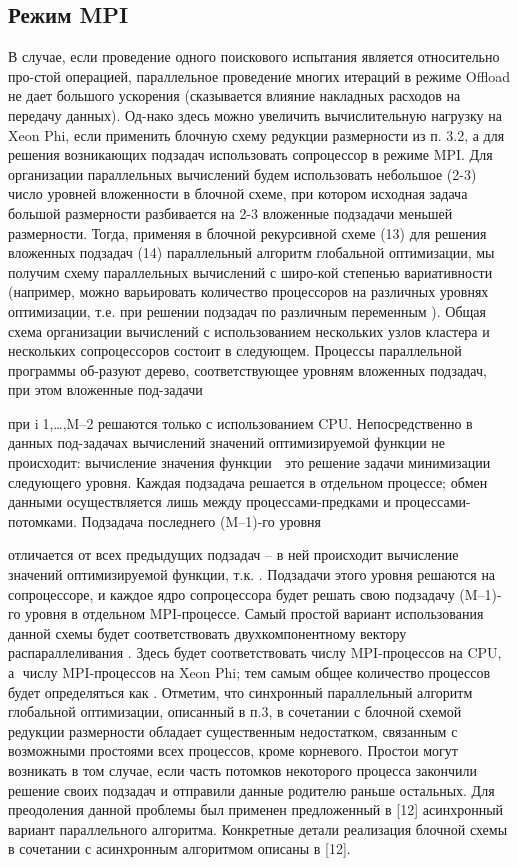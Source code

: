 \subsection{Режим MPI}
В случае, если проведение одного поискового испытания является относительно про-стой операцией, параллельное проведение многих итераций в режиме Offload не дает большого ускорения (сказывается влияние накладных расходов на передачу данных). Од-нако здесь можно увеличить вычислительную нагрузку на Xeon Phi, если применить блочную схему редукции размерности из п. 3.2, а для решения возникающих подзадач использовать сопроцессор в режиме MPI.
Для организации параллельных вычислений будем использовать небольшое (2-3) число уровней вложенности в блочной схеме, при котором исходная задача большой размерности разбивается на 2-3 вложенные подзадачи меньшей размерности. Тогда, применяя в блочной рекурсивной схеме (13) для решения вложенных подзадач (14) параллельный алгоритм глобальной оптимизации, мы получим схему параллельных вычислений с широ-кой степенью вариативности (например, можно варьировать количество процессоров на различных уровнях оптимизации, т.е. при решении подзадач по различным переменным  ).
Общая схема организации вычислений с использованием нескольких узлов кластера и нескольких сопроцессоров состоит в следующем. Процессы параллельной программы об-разуют дерево, соответствующее уровням вложенных подзадач, при этом вложенные под-задачи
 
при i1,…,M–2 решаются только с использованием CPU. Непосредственно в данных под-задачах вычислений значений оптимизируемой функции не происходит: вычисление значения функции   это решение задачи минимизации следующего уровня. Каждая подзадача решается в отдельном процессе; обмен данными осуществляется лишь между процессами-предками и процессами-потомками.
Подзадача последнего (M–1)-го уровня 
 
отличается от всех предыдущих подзадач – в ней происходит вычисление значений оптимизируемой функции, т.к.  . Подзадачи этого уровня решаются на сопроцессоре, и каждое ядро сопроцессора будет решать свою подзадачу (M–1)-го уровня в отдельном MPI-процессе.
Самый простой вариант использования данной схемы будет соответствовать двухкомпонентному вектору распараллеливания  . Здесь   будет соответствовать числу MPI-процессов на CPU, а  числу MPI-процессов на Xeon Phi; тем самым общее количество процессов будет определяться как  .
Отметим, что синхронный параллельный алгоритм глобальной оптимизации, описанный в п.3, в сочетании с блочной схемой редукции размерности обладает существенным недостатком, связанным с возможными простоями всех процессов, кроме корневого. Простои могут возникать в том случае, если часть потомков некоторого процесса закончили решение своих подзадач и отправили данные родителю раньше остальных. Для преодоления данной проблемы был применен предложенный в [12] асинхронный вариант параллельного алгоритма. Конкретные детали реализация блочной схемы в сочетании с асинхронным алгоритмом описаны в [12].
